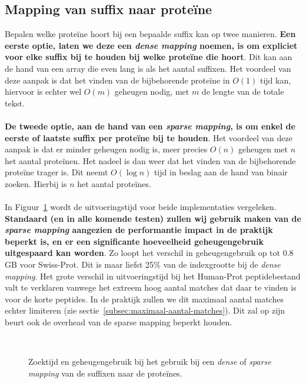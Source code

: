 \subsection{Mapping van suffix naar proteïne}\label{subsec:mapping-van-suffix-naar-proteine}
Bepalen welke proteïne hoort bij een bepaalde suffix kan op twee manieren.
\textbf{Een eerste optie, laten we deze een \textit{dense mapping} noemen, is om expliciet voor elke suffix bij te houden bij welke proteïne die hoort}.
Dit kan aan de hand van een array die even lang is als het aantal suffixen.
Het voordeel van deze aanpak is dat het vinden van de bijbehorende proteïne in $O(1)$ tijd kan, hiervoor is echter wel $O(m)$ geheugen nodig, met $m$ de lengte van de totale tekst.
\\ \\
\textbf{De tweede optie, aan de hand van een \textit{sparse mapping}, is om enkel de eerste of laatste suffix per proteïne bij te houden}.
Het voordeel van deze aanpak is dat er minder geheugen nodig is, meer precies $O(n)$ geheugen met $n$ het aantal proteïnen.
Het nadeel is dan weer dat het vinden van de bijbehorende proteïne trager is.
Dit neemt $O(\log n)$ tijd in beslag aan de hand van binair zoeken.
Hierbij is $n$ het aantal proteïnes.
\\ \\
In Figuur~\ref{fig:dense_vs_sparse} wordt de uitvoeringstijd voor beide implementaties vergeleken.
\textbf{Standaard (en in alle komende testen) zullen wij gebruik maken van de \textit{sparse mapping} aangezien de performantie impact in de praktijk beperkt is, en er een significante hoeveelheid geheugengebruik uitgespaard kan worden}.
Zo loopt het verschil in geheugengebruik op tot 0.8 GB voor Swiss-Prot.
Dit is maar liefst 25\% van de indexgrootte bij de \textit{dense mapping}.
Het grote verschil in uitvoeringstijd bij het Human-Prot peptidebestand valt te verklaren vanwege het extreem hoog aantal matches dat daar te vinden is voor de korte peptides.
In de praktijk zullen we dit maximaal aantal matches echter limiteren (zie sectie~\ref{subsec:maximaal-aantal-matches}).
Dit zal op zijn beurt ook de overhead van de sparse mapping beperkt houden.
\begin{figure}[H]
    \centering
    \\[4ex] %

    \caption{Zoektijd en geheugengebruik bij het gebruik bij een \textit{dense} of \textit{sparse mapping} van de suffixen naar de proteïnes.}\label{fig:dense_vs_sparse}
\end{figure}

